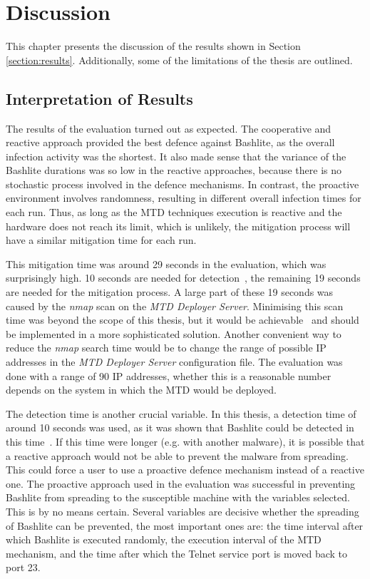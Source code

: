 \chapter{Discussion} \label{chapter:discussion}
This chapter presents the discussion of the results shown in Section \ref{section:results}. Additionally, some of the limitations of the thesis are outlined.


\section{Interpretation of Results}
The results of the evaluation turned out as expected. The cooperative and reactive approach provided the best defence against Bashlite, as the overall infection activity was the shortest. It also made sense that the variance of the Bashlite durations was so low in the reactive approaches, because there is no stochastic process involved in the defence mechanisms. In contrast, the proactive environment involves randomness, resulting in different overall infection times for each run. Thus, as long as the MTD techniques execution is reactive and the hardware does not reach its limit, which is unlikely, the mitigation process will have a similar mitigation time for each run. 

This mitigation time was around 29 seconds in the evaluation, which was surprisingly high. 10 seconds are needed for detection~\cite{article:vonderAssen}, the remaining 19 seconds are needed for the mitigation process. A large part of these 19 seconds was caused by the \textit{nmap} scan on the \textit{MTD Deployer Server}. Minimising this scan time was beyond the scope of this thesis, but it would be achievable~\cite{website:nmapTiming} and should be implemented in a more sophisticated solution. Another convenient way to reduce the \textit{nmap} search time would be to change the range of possible IP addresses in the \textit{MTD Deployer Server} configuration file. The evaluation was done with a range of 90 IP addresses, whether this is a reasonable number depends on the system in which the MTD would be deployed.

The detection time is another crucial variable. In this thesis, a detection time of around 10 seconds was used, as it was shown that Bashlite could be detected in this time~\cite{article:vonderAssen}. If this time were longer (e.g. with another malware), it is possible that a reactive approach would not be able to prevent the malware from spreading. This could force a user to use a proactive defence mechanism instead of a reactive one. The proactive approach used in the evaluation was successful in preventing Bashlite from spreading to the susceptible machine with the variables selected. This is by no means certain. Several variables are decisive whether the spreading of Bashlite can be prevented, the most important ones are: the time interval after which Bashlite is executed randomly, the execution interval of the MTD mechanism, and the time after which the Telnet service port is moved back to port 23. 


